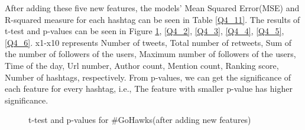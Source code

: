 \documentclass{article}
\begin{document}
After adding these five new features, the models' Mean Squared Error(MSE) and R-squared measure for each hashtag can be seen in Table \ref{Q4_11}. The results of t-test and p-values can be seen in Figure \ref{Q4_1}, \ref{Q4_2}, \ref{Q4_3}, \ref{Q4_4}, \ref{Q4_5}, \ref{Q4_6}. x1-x10 represents Number of tweets, Total number of retweets, Sum of the number of followers of the users, Maximum number of followers of the users, Time of the day, Url number, Author count, Mention count, Ranking score, Number of hashtags, respectively. From p-values, we can get the significance of each feature for every hashtag, i.e., The feature with smaller p-value has higher significance.

\begin{figure}
\centering
{}
\caption{t-test and p-values for \#GoHawks(after adding new features)} \label{Q4_1}
\end{figure}
\end{document}
